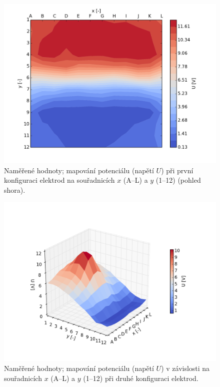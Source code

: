 \documentclass[english]{article}
\begin{document}
	\begin{figure}[h!]
	\begin{center}
	    \vspace*{-0.5cm}
		\includegraphics[width=0.8\linewidth]{../gnuplot/konfigurace_1_map.png}
	    \vspace*{-1cm}
		\caption{Naměřené hodnoty; mapování potenciálu (napětí $U$) při první konfiguraci elektrod na souřadnicích $x$ (A--L) a $y$ (1--12) (pohled shora).} 
		\label{fig:g_konf1_mapa}
	\end{center}
	\end{figure}
	\begin{figure}[h!]
	\begin{center}
	    \vspace*{-1.5cm}
		\includegraphics[width=\linewidth]{../gnuplot/konfigurace_2.png}
	    \vspace*{-2cm}
		\caption{Naměřené hodnoty; mapování potenciálu (napětí $U$) v závislosti na souřadnicích $x$ (A--L) a $y$ (1--12) při druhé konfiguraci elektrod.} 
		\label{fig:g_konf2}
	\end{center}
	\end{figure}			
\end{document}
